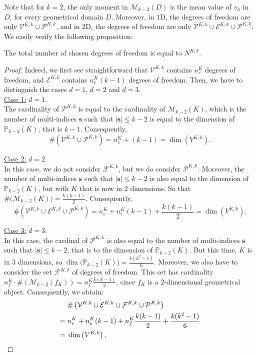 \noindent Note that for $k=2$, the only moment in $\mathcal{M}_{k-2}(D)$ is the mean value of $v_h$ in $D$, for every geometrical domain $D$.  Moreover, in $1$D, the degrees of freedom are only $\mathcal{V}^{K,k}\cup\mathcal{P}^{K,k}$, and in $2$D, the degrees of freedom are only $\mathcal{V}^{K,k}\cup\mathcal{E}^{K,k} \cup\mathcal{P}^{K,k}$.
We easily verify the following proposition:
\begin{proposition} \label{chosenlocaldofnb}
The total number of chosen degrees of freedom is equal to $N^{K,k}$. 
\end{proposition}
\begin{proof}
Indeed, we first see straightforward that $\mathcal{V}^{K,k}$ contains $n_v^K$ degrees of freedom, and $\mathcal{E}^{K,k}$ contains $n_e^K(k-1)$ degrees of freedom. Then, we have to distinguish the cases $d=1$, $d=2$ and $d=3$. \\

\noindent \underline{Case 1:} $d=1$. \\
\noindent The cardinality of $\mathcal{P}^{K,k}$ is equal to the cardinality of $\mathcal{M}_{k-2}(K)$, which is the number of multi-indices $\mathbf{s}$ such that $|\mathbf{s}|\leq k-2$ is equal to the dimension of $\mathbb{P}_{k-2}(K)$, that is $k-1$. Consequently, 
$$\#\left(\mathcal{V}^{K,k} \cup\mathcal{P}^{K,k}\right)=n_v^K
+(k-1)= \dim\left(V^{K,k}\right).
$$

\noindent \underline{Case 2:} $d=2$.\\
\noindent In this case, we do not consider $\mathcal{F}^{K,k}$, but we do consider $\mathcal{P}^{K,k}$. Moreover, the number of multi-indices $\mathbf{s}$ such that $|\mathbf{s}|\leq k-2$ is also equal to the dimension of $\mathbb{P}_{k-2}(K)$, but with $K$ that is now in $2$ dimensions. So that $\#\big(\mathcal{M}_{k-2}(K)\big) = \frac{k(k-1)}{2}$. Consequently, 
$$\#\left(\mathcal{V}^{K,k}\cup \mathcal{E}^{K,k} \cup\mathcal{P}^{K,k}\right)=n_v^K
+ n_e^K(k-1) + \frac{k(k-1)}{2}= \dim\left(V^{K,k}\right).
$$

\noindent \underline{Case 3:} $d=3$.\\
\noindent In this case, the cardinal of $\mathcal{P}^{K,k}$ is also equal to the number of multi-indices $\mathbf{s}$ such that $|\mathbf{s}|\leq k-2$, that is to the dimension of $\mathbb{P}_{k-2}(K)$. But this time, $K$ is in $3$ dimensions, so $\dim\big(\mathbb{P}_{k-2}(K)\big) = \frac{k(k^2-1)}{6}.$ Moreover, we also have to consider the set $\mathcal{F}^{K,k}$ of degrees of freedom. This set has cardinality $n_f^K\cdot\#\left(\mathcal{M}_{k-2}(f_K)\right) = n_f^K\frac{k(k-1)}{2}$, since $f_K$ is a $2$-dimensional geometrical object. Consequently, we obtain:
\begin{align*}
&\#\left(\mathcal{V}^{K,k}\cup \mathcal{E}^{K,k}\cup\mathcal{F}^{K,k} \cup\mathcal{P}^{K,k}\right)\\
= \hspace{1mm}&n_v^K
+ n_e^K(k-1) + n_f^K\frac{k(k-1)}{2} + \frac{k(k^2-1)}{6}\\
= \hspace{1mm}&\dim\left(V^{K,k}\right).
\end{align*}
\end{proof}

